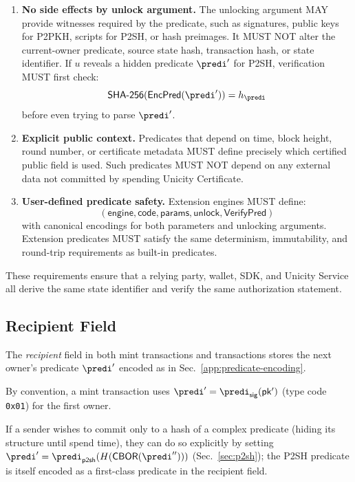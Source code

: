 \begin{enumerate}
    \item \textbf{No side effects by unlock argument.}
    The unlocking argument MAY provide witnesses required by the predicate, such as signatures, public keys for P2PKH, scripts for P2SH, or hash preimages. It MUST NOT alter the current-owner predicate, source state hash, transaction hash, or state identifier. If $u$ reveals a hidden predicate $\predi'$ for P2SH, verification MUST first check:
    \[
      \mathsf{SHA\text{-}256}(\encpred(\predi')) = h_\predi
    \]
    before even trying to parse $\predi'$.

    \item \textbf{Explicit public context.}
    Predicates that depend on time, block height, round number, or certificate metadata MUST define precisely which certified public field is used. Such predicates MUST NOT depend on any external data not committed by spending Unicity Certificate.

    \item \textbf{User-defined predicate safety.}
    Extension engines MUST define:
    \[
      (\mathsf{engine},\mathsf{code},\mathsf{params},\mathsf{unlock},\mathsf{VerifyPred})
    \]
    with canonical encodings for both parameters and unlocking arguments. Extension predicates MUST satisfy the same determinism,
  immutability, and round-trip requirements as built-in predicates.
  \end{enumerate}

  \noindent These requirements ensure that a relying party, wallet, SDK, and Unicity Service all derive the same state identifier and verify the same authorization statement.

\subsection{Recipient Field}

The \emph{recipient} field in both mint transactions and transactions stores the next owner's predicate $\predi'$ encoded as in Sec.~\ref{app:predicate-encoding}.

By convention, a mint transaction uses $\predi' = \predi_\mathsf{sig}(\mathsf{pk'})$ (type code \texttt{0x01}) for the first owner.

If a sender wishes to commit only to a hash of a complex predicate (hiding its structure until spend time), they can do so explicitly by setting $\predi' = \predi_\mathsf{p2sh}(H(\mathsf{CBOR}(\predi'')))$ (Sec.~\ref{sec:p2sh}); the P2SH predicate is itself encoded as a first-class predicate in the recipient field.


